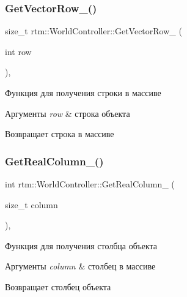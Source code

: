 \subsubsection{\texorpdfstring{Get\+Vector\+Row\+\_\+()}{GetVectorRow\_()}}
{\footnotesize\ttfamily size\+\_\+t rtm\+::\+World\+Controller\+::\+Get\+Vector\+Row\+\_\+ (\begin{DoxyParamCaption}\item[{int}]{row }\end{DoxyParamCaption})\hspace{0.3cm}{\ttfamily [inline]}, {\ttfamily [private]}}

Функция для получения строки в массиве 
\begin{DoxyParams}{Аргументы}
{\em row} & строка объекта \\
\hline
\end{DoxyParams}
\begin{DoxyReturn}{Возвращает}
строка в массиве 
\end{DoxyReturn}
\mbox{\label{classrtm_1_1_world_controller_a73f4df1b8493c6d6d0a6b3cdb21a076c}} 
\subsubsection{\texorpdfstring{Get\+Real\+Column\+\_\+()}{GetRealColumn\_()}}
{\footnotesize\ttfamily int rtm\+::\+World\+Controller\+::\+Get\+Real\+Column\+\_\+ (\begin{DoxyParamCaption}\item[{size\+\_\+t}]{column }\end{DoxyParamCaption})\hspace{0.3cm}{\ttfamily [inline]}, {\ttfamily [private]}}

Функция для получения столбца объекта 
\begin{DoxyParams}{Аргументы}
{\em column} & столбец в массиве \\
\hline
\end{DoxyParams}
\begin{DoxyReturn}{Возвращает}
столбец объекта 
\end{DoxyReturn}
\mbox{\label{classrtm_1_1_world_controller_a3aad7b071f3e8a80ab159e89ec5c8035}} 
